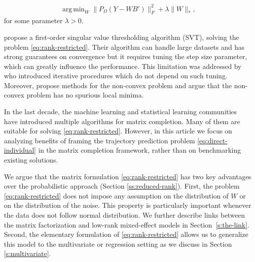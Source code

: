 \documentclass[preprint]{imsart}
\numberwithin{equation}{section}
\theoremstyle{plain}
\DeclareMathOperator*{\argmin}{arg\,min}
\DeclareMathOperator*{\rank}{rank}
\begin{document}

\begin{align}
  \argmin_W \| P_\Omega(Y - WB') \|_F^2 + \lambda\|W\|_*,
\label{eq:rank-restricted}
\end{align}
for some parameter $\lambda > 0$.

\citet{cai2010singular} propose a first-order singular value thresholding algorithm (SVT), solving the problem \eqref{eq:rank-restricted}. Their algorithm can handle large datasets and has strong guarantees on convergence but it requires tuning the step size parameter, which can greatly influence the performance. This limitation was addressed by \citet{ma2011fixed,mazumder2010spectral,hastie2015matrix} who introduced iterative procedures which do not depend on such tuning. Moreover, \citet{hardt2014fast,chen2015fast} propose methods for the non-convex problem and \citet{ge2016matrix} argue that the non-convex problem has no spurious local minima.

In the last decade, the machine learning and statistical learning communities have introduced multiple algorithms for matrix completion. Many of them are suitable for solving \eqref{eq:rank-restricted}. However, in this article we focus on analyzing benefits of framing the trajectory prediction problem \eqref{eq:direct-individual} in the matrix completion framework, rather than on benchmarking existing solutions.

We argue that the matrix formulation \eqref{eq:rank-restricted} has two key advantages over the probabilistic approach (Section \ref{ss:reduced-rank}). First, the problem \eqref{eq:rank-restricted} does not impose any assumption on the distribution of $W$ or on the distribution of the noise. This property is particularly important whenever the data does not follow normal distribution. We further describe links between the matrix factorization and low-rank mixed-effect models in Section~\ref{s:the-link}. Second, the elementary formulation of \eqref{eq:rank-restricted} allows us to generalize this model to the multivariate or regression setting as we discuss in Section \ref{s:multivariate}.  
\end{document}
